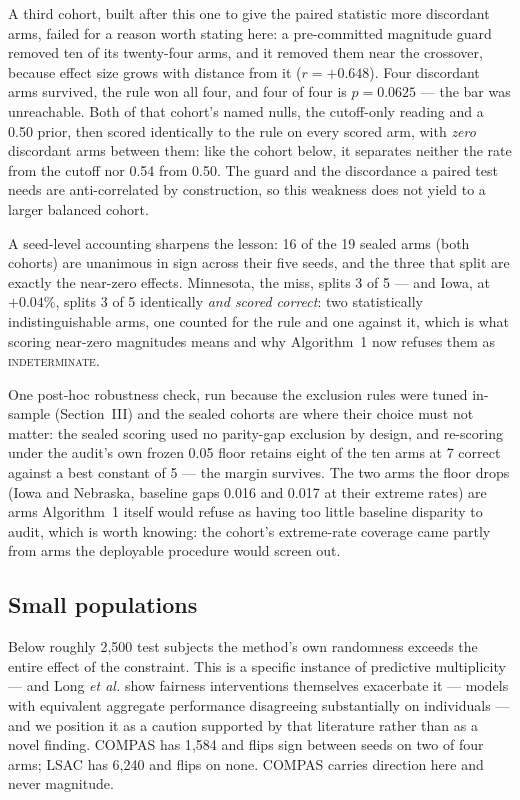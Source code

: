 \documentclass[conference]{IEEEtran}
\begin{document}
A third cohort, built after this one to give the paired statistic more discordant arms,
failed for a reason worth stating here: a pre-committed magnitude guard removed ten of its
twenty-four arms, and it removed them near the crossover, because effect size grows with
distance from it ($r = +0.648$). Four discordant arms survived, the rule won all four, and
four of four is $p = 0.0625$ --- the bar was unreachable. Both of that cohort's named nulls,
the cutoff-only reading and a 0.50 prior, then scored identically to the rule on every
scored arm, with \emph{zero} discordant arms between them: like the cohort below, it
separates neither the rate from the cutoff nor 0.54 from 0.50. The guard and the
discordance a paired test needs are anti-correlated by construction, so this weakness does
not yield to a larger balanced cohort.

A seed-level accounting sharpens the lesson: 16 of the 19 sealed arms (both cohorts) are
unanimous in sign across their five seeds, and the three that split are exactly the
near-zero effects. Minnesota, the miss, splits 3 of 5 --- and Iowa, at $+0.04\%$,
splits 3 of 5 identically \emph{and scored correct}: two statistically indistinguishable
arms, one counted for the rule and one against it, which is what scoring near-zero
magnitudes means and why Algorithm~1 now refuses them as \textsc{indeterminate}.

One post-hoc robustness check, run because the exclusion rules were tuned in-sample
(Section~III) and the sealed cohorts are where their choice must not matter: the sealed
scoring used no parity-gap exclusion by design, and re-scoring under the audit's own
frozen 0.05 floor retains eight of the ten arms at 7 correct against a best constant of
5 --- the margin survives. The two arms the floor drops (Iowa and Nebraska, baseline gaps
0.016 and 0.017 at their extreme rates) are arms Algorithm~1 itself would refuse as
having too little baseline disparity to audit, which is worth knowing: the cohort's
extreme-rate coverage came partly from arms the deployable procedure would screen out.

\subsection{Small populations}

Below roughly 2{,}500 test subjects the method's own randomness exceeds the entire effect of
the constraint. This is a specific instance of predictive multiplicity
\cite{black2022,long2023} --- and Long \emph{et al.} \cite{long2023} show fairness
interventions themselves exacerbate it ---
models with equivalent aggregate performance disagreeing substantially on individuals --- and
we position it as a caution supported by that literature rather than as a novel finding. COMPAS has 1{,}584 and flips sign between seeds on two of four arms; LSAC has
6{,}240 and flips on none. COMPAS carries direction here and never magnitude.
\end{document}
